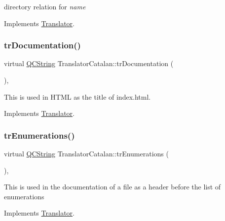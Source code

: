 directory relation for {\itshape name} 

Implements \mbox{\hyperlink{class_translator}{Translator}}.

\mbox{\label{class_translator_catalan_aa4d642957dee7d961dfb9d62edf97dae}} 
\subsubsection{\texorpdfstring{trDocumentation()}{trDocumentation()}}
{\footnotesize\ttfamily virtual \mbox{\hyperlink{class_q_c_string}{Q\+C\+String}} Translator\+Catalan\+::tr\+Documentation (\begin{DoxyParamCaption}{ }\end{DoxyParamCaption})\hspace{0.3cm}{\ttfamily [inline]}, {\ttfamily [virtual]}}

This is used in H\+T\+ML as the title of index.\+html. 

Implements \mbox{\hyperlink{class_translator}{Translator}}.

\mbox{\label{class_translator_catalan_a7630b9b388daad151c69d076a943e068}} 
\subsubsection{\texorpdfstring{trEnumerations()}{trEnumerations()}}
{\footnotesize\ttfamily virtual \mbox{\hyperlink{class_q_c_string}{Q\+C\+String}} Translator\+Catalan\+::tr\+Enumerations (\begin{DoxyParamCaption}{ }\end{DoxyParamCaption})\hspace{0.3cm}{\ttfamily [inline]}, {\ttfamily [virtual]}}

This is used in the documentation of a file as a header before the list of enumerations 

Implements \mbox{\hyperlink{class_translator}{Translator}}.

\mbox{\label{class_translator_catalan_a39b60b3ec933098848fede7de9fbaf57}} 
